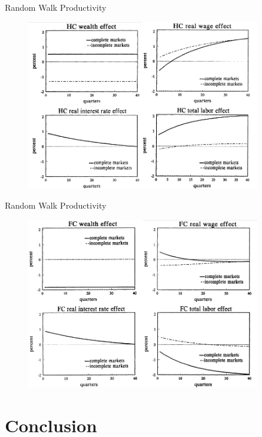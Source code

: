 \documentclass[10pt]{beamer}
\begin{document}
\begin{frame}{Random Walk Productivity}
\begin{figure}[thbp]
  \centering
  \includegraphics[width=0.90\textwidth]{15.png}
\end{figure}
\end{frame}

\begin{frame}{Random Walk Productivity}
\begin{figure}[thbp]
  \centering
  \includegraphics[width=0.90\textwidth]{16.png}
\end{figure}
\end{frame}



\section{Conclusion}
\end{document}

